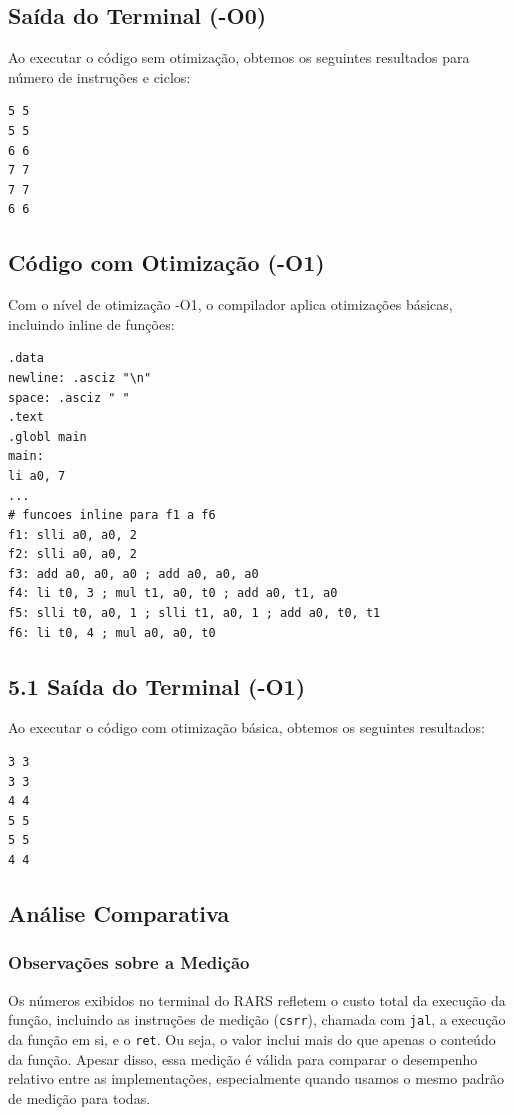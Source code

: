 \documentclass[12pt,a4paper]{article}
\begin{document}
\subsection*{Saída do Terminal (-O0)}
Ao executar o código sem otimização, obtemos os seguintes resultados para número de instruções e ciclos:
\begin{verbatim}
5 5
5 5
6 6
7 7
7 7
6 6
\end{verbatim}

\subsection*{Código com Otimização (-O1)}
Com o nível de otimização -O1, o compilador aplica otimizações básicas, incluindo inline de funções:
\begin{lstlisting}[language=Assembly]
.data
newline: .asciz "\n"
space: .asciz " "
.text
.globl main
main:
li a0, 7
...
# funcoes inline para f1 a f6
f1: slli a0, a0, 2
f2: slli a0, a0, 2
f3: add a0, a0, a0 ; add a0, a0, a0
f4: li t0, 3 ; mul t1, a0, t0 ; add a0, t1, a0
f5: slli t0, a0, 1 ; slli t1, a0, 1 ; add a0, t0, t1
f6: li t0, 4 ; mul a0, a0, t0
\end{lstlisting}

\subsection*{5.1 Saída do Terminal (-O1)}
Ao executar o código com otimização básica, obtemos os seguintes resultados:
\begin{verbatim}
3 3
3 3
4 4
5 5
5 5
4 4
\end{verbatim}

\subsection*{Análise Comparativa}
\subsubsection*{Observações sobre a Medição}
Os números exibidos no terminal do RARS refletem o custo total da execução da função, incluindo as instruções de medição (\texttt{csrr}), chamada com \texttt{jal}, a execução da função em si, e o \texttt{ret}. Ou seja, o valor inclui mais do que apenas o conteúdo da função.
Apesar disso, essa medição é válida para comparar o desempenho relativo entre as implementações, especialmente quando usamos o mesmo padrão de medição para todas.
\end{document}
